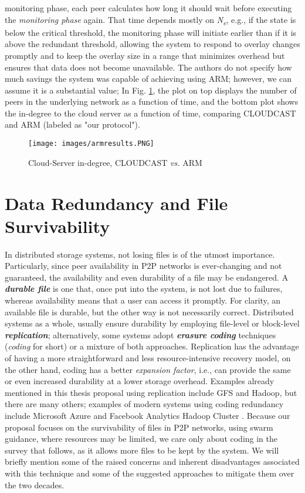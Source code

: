 \documentclass[runningheads]{llncs}
\begin{document}
monitoring phase, each peer calculates how long it should wait before executing the \textit{monitoring phase} again. That time depends mostly on \textit{N\textsubscript{e}}, e.g., if the state is below the critical threshold, the monitoring phase will initiate earlier than if it is above the redundant threshold, allowing the system to respond to overlay changes promptly and to keep the overlay size in a range that minimizes overhead but ensures that data does not become unavailable. The authors do not specify how much savings the system was capable of achieving using ARM; however, we can assume it is a substantial value; In Fig. \ref{fig:arm_results}, the plot on top displays the number of peers in the underlying network as a function of time, and the bottom plot shows the in-degree to the cloud server as a function of time, comparing CLOUDCAST and ARM (labeled as "our protocol").

\begin{figure}[!ht]
\centering
\texttt{[image: images/armresults.PNG]}
\caption{Cloud-Server in-degree, CLOUDCAST \textit{vs.} ARM \cite{marriage_of_convinience}}
\label{fig:arm_results}
\end{figure}

\newpage\section{Data Redundancy and File Survivability}\label{sec:dataredundancy}
In distributed storage systems, not losing files is of the utmost importance. Particularly, since peer availability in P2P networks is ever-changing and not guaranteed, the availability and even durability of a file may be endangered. A \textbf{\textit{durable file}} is one that, once put into the system, is not lost due to failures, whereas availability means that a user can access it promptly. For clarity, an available file is durable, but the other way is not necessarily correct. Distributed systems as a whole, usually ensure durability by employing file-level or block-level \textbf{\textit{replication}}; alternatively, some systems adopt \textbf{\textit{erasure coding}} techniques (\textit{coding} for short) or a mixture of both approaches. Replication has the advantage of having a more straightforward and less resource-intensive recovery model, on the other hand, coding has a better \textit{expansion factor}, i.e., can provide the same or even increased durability at a lower storage overhead. Examples already mentioned in this thesis proposal using replication include GFS and Hadoop, but there are many others; examples of modern systems using coding redundancy include Microsoft Azure and Facebook Analytics Hadoop Cluster \cite{lrc}. Because our proposal focuses on the survivability of files in P2P networks, using swarm guidance, where resources may be limited, we care only about coding in the survey that follows, as it allows more files to be kept by the system. We will briefly mention some of the raised concerns and inherent disadvantages associated with this technique and some of the suggested approaches to mitigate them over the two decades.
\end{document}
